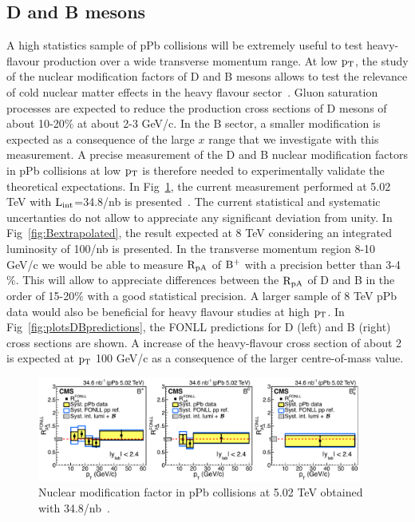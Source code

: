 \subsection{D and B mesons}
A high statistics sample of pPb collisions will be extremely useful to test heavy-flavour production over a wide transverse momentum range.
At low $\rm p_{T}$, the study of the nuclear modification factors of D and B mesons allows to test the relevance of cold nuclear matter effects in the 
heavy flavour sector~\cite{Eskola:2009uj,deFlorian:2003qf,Frankfurt:2011cs}. Gluon saturation processes are expected to reduce the production 
cross sections of D mesons of about 10-20$\%$ at about 2-3 GeV/c.  
In the B sector, a smaller modification is expected as a consequence of the large $x$ range that we investigate with this measurement.
A precise measurement of the D and B nuclear modification factors in pPb collisions at low $\rm p_{T}$ is therefore needed to experimentally validate
the theoretical expectations.
In Fig~\ref{fig:measurementB}, the current measurement performed at 5.02 TeV with  $\rm L_{int}$=34.8/nb is presented~\cite{PhysRevLett.116.032301}. The current statistical 
and systematic uncertanties do not allow to appreciate any significant deviation from unity. In Fig~\ref{fig:Bextrapolated}, the result expected at 8 TeV
considering an integrated luminosity of 100/nb is presented.  In the transverse momentum region 8-10 GeV/c we would be able to measure $\rm R_{pA}$ 
of $\rm B^{+}$ with a precision better than 3-4$\%$. This will allow to appreciate differences between the $\rm R_{pA}$  of D and B in the order of 15-20$\%$
with a good statistical precision. A larger sample of 8 TeV pPb data would also be beneficial for heavy flavour studies at high $\rm p_{T}$.  In Fig~\ref{fig:plotsDBpredictions}, 
the FONLL predictions for D (left) and B (right) cross sections are shown. A  increase of the heavy-flavour cross section of about 2 is
expected at $\rm p_{T}~$100 GeV/c as a consequence of the larger centre-of-mass value. 

\begin{figure}[h]
\begin{center}
\includegraphics[width= 0.95\textwidth]{figures/nuclearmodification.pdf}
\caption{Nuclear modification factor in pPb collisions at 5.02 TeV obtained with 34.8/nb~\cite{PhysRevLett.116.032301}.}
\label{fig:measurementB}
\end{center}
\end{figure}




